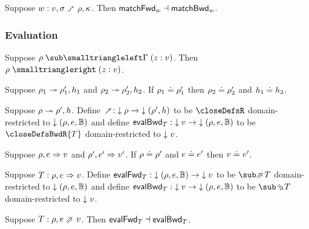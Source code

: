 \begin{theorem}
\label{thm:core-language:match:gc}
   Suppose $w: v, \sigma \matchFwdS \rho, \kappa$.  Then $\mathsf{matchFwd}_{w} \dashv \mathsf{matchBwd}_{w}$.
\end{theorem}

\subsubsection{Evaluation}





\begin{lemma}
\label{lem:core-language:env-get-put}
   Suppose $\envLookupBwd{\rho}{\Gamma}{\bind{z}{v}}$. Then $\envLookup{\rho}{z}{v}$.
\end{lemma}

\begin{lemma}
    Suppose $\rho_1 \mathrel{\twoheadrightarrow} \rho_1', h_1$ and $\rho_2 \mathrel{\twoheadrightarrow} \rho_2', h_2$. If $\rho_1 \doteq \rho_1'$ then $\rho_2 \doteq \rho_2'$ and $h_1 \doteq h_2$.
\end{lemma}

\begin{definition}
   Suppose $\rho \mathrel{\twoheadrightarrow} \rho', h$. Define $\closeDefsFwd: \Below{\rho} \to \Below{(\rho', h)}$ to be $\closeDefsR$ domain-restricted to ${\downarrow{(\rho, e, \mathbb{B})}}$ and define $\mathsf{evalBwd}_{T}: {\downarrow{v}} \to {\downarrow{(\rho, e, \mathbb{B})}}$ to be $\closeDefsBwdR{T}$ domain-restricted to ${\downarrow{v}}$.
\end{definition}

\begin{lemma}
   Suppose $\rho, e \mathrel{\Rightarrow} v$ and $\rho', e' \mathrel{\Rightarrow} v'$. If $\rho \doteq \rho'$ and $e \doteq e'$ then $v \doteq v'$.
\end{lemma}

\begin{definition}
   Suppose $T: \rho, e \mathrel{\Rightarrow} v$. Define $\mathsf{evalFwd}_{T}: {\downarrow{(\rho, e, \mathbb{B})}} \to {\downarrow{v}}$ to be $\evalFwdR{T}$ domain-restricted to ${\downarrow{(\rho, e, \mathbb{B})}}$ and define $\mathsf{evalBwd}_{T}: {\downarrow{v}} \to {\downarrow{(\rho, e, \mathbb{B})}}$ to be $\evalBwdR{T}$ domain-restricted to ${\downarrow{v}}$.
\end{definition}

\begin{theorem}
\label{thm:core-language:eval:gc}
   Suppose $T: \rho, e \evalFwdS v$.  Then $\mathsf{evalFwd}_{T} \dashv \mathsf{evalBwd}_{T}$.
\end{theorem}
